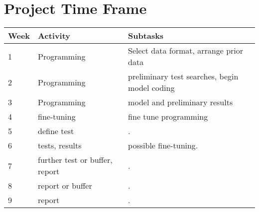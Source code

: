 \documentclass[10pt,letterpaper,final]{article}
\begin{document}
\section{Project Time Frame}
\begin{center}
	\begin{tabular}{lll}
		Week & Activity & Subtasks \\ \hline
		1 & Programming & Select data format, arrange prior data \\
		2 & Programming & preliminary test searches, begin model coding \\
		3 & Programming & model and preliminary results \\
		4 & fine-tuning & fine tune programming \\
		5 & define test & . \\
		6 & tests, results & possible fine-tuning. \\
		7 & further test or buffer, report & . \\
		8 & report or buffer & . \\
		9 & report & . \\
	\end{tabular}
	\label{tab:timeestimates}
\end{center}




%
%
\end{document}
